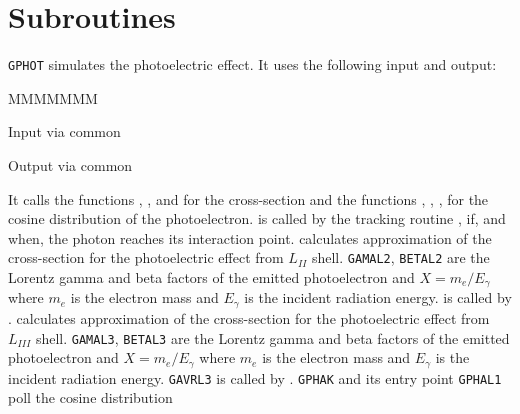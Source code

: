 \section{Subroutines}
{\tt GPHOT} simulates the photoelectric effect. It uses the following
input and output:
\begin{DLtt}{MMMMMMM}
\item[Input]{via common }
\item[Output]{via common }
\end{DLtt}
It calls the functions , , 
and  for the cross-section and the functions ,
, ,  for the cosine distribution 
of the photoelectron.  is called by the tracking routine
, if, and when, the photon reaches its interaction point.
 calculates approximation of the cross-section for the 
photoelectric effect from $L_{II}$ shell. {\tt GAMAL2},
{\tt BETAL2} are the Lorentz gamma and beta factors of the emitted 
photoelectron and $X = m_e/E_\gamma$ where $m_e$ is
the electron mass and $E_\gamma$ is the incident radiation energy.
 is called by .
 calculates approximation of the cross-section for the 
photoelectric effect from $L_{III}$ shell.
{\tt GAMAL3}, {\tt BETAL3} are the Lorentz gamma and beta factors of the 
emitted photoelectron and $X = m_e/E_\gamma$ where $m_e$ is the electron 
mass and $E_\gamma$ is the  incident radiation energy.
{\tt GAVRL3} is called by .
{\tt GPHAK} and its entry point {\tt GPHAL1} poll the cosine distribution 

